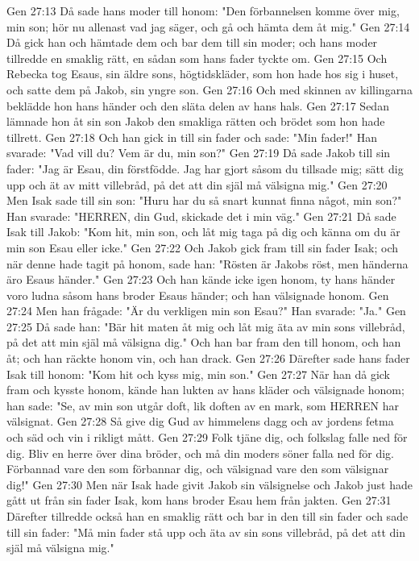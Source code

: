 Gen 27:13  Då sade hans moder till honom: "Den förbannelsen komme över mig, min son; hör nu allenast vad jag säger, och gå och hämta dem åt mig."
Gen 27:14  Då gick han och hämtade dem och bar dem till sin moder; och hans moder tillredde en smaklig rätt, en sådan som hans fader tyckte om.
Gen 27:15  Och Rebecka tog Esaus, sin äldre sons, högtidskläder, som hon hade hos sig i huset, och satte dem på Jakob, sin yngre son.
Gen 27:16  Och med skinnen av killingarna beklädde hon hans händer och den släta delen av hans hals.
Gen 27:17  Sedan lämnade hon åt sin son Jakob den smakliga rätten och brödet som hon hade tillrett.
Gen 27:18  Och han gick in till sin fader och sade: "Min fader!" Han svarade: "Vad vill du? Vem är du, min son?"
Gen 27:19  Då sade Jakob till sin fader: "Jag är Esau, din förstfödde. Jag har gjort såsom du tillsade mig; sätt dig upp och ät av mitt villebråd, på det att din själ må välsigna mig."
Gen 27:20  Men Isak sade till sin son: "Huru har du så snart kunnat finna något, min son?" Han svarade: "HERREN, din Gud, skickade det i min väg."
Gen 27:21  Då sade Isak till Jakob: "Kom hit, min son, och låt mig taga på dig och känna om du är min son Esau eller icke."
Gen 27:22  Och Jakob gick fram till sin fader Isak; och när denne hade tagit på honom, sade han: "Rösten är Jakobs röst, men händerna äro Esaus händer."
Gen 27:23  Och han kände icke igen honom, ty hans händer voro ludna såsom hans broder Esaus händer; och han välsignade honom.
Gen 27:24  Men han frågade: "Är du verkligen min son Esau?" Han svarade: "Ja."
Gen 27:25  Då sade han: "Bär hit maten åt mig och låt mig äta av min sons villebråd, på det att min själ må välsigna dig." Och han bar fram den till honom, och han åt; och han räckte honom vin, och han drack.
Gen 27:26  Därefter sade hans fader Isak till honom: "Kom hit och kyss mig, min son."
Gen 27:27  När han då gick fram och kysste honom, kände han lukten av hans kläder och välsignade honom; han sade: "Se, av min son utgår doft, lik doften av en mark, som HERREN har välsignat.
Gen 27:28  Så give dig Gud av himmelens dagg och av jordens fetma och säd och vin i rikligt mått.
Gen 27:29  Folk tjäne dig, och folkslag falle ned för dig. Bliv en herre över dina bröder, och må din moders söner falla ned för dig. Förbannad vare den som förbannar dig, och välsignad vare den som välsignar dig!"
Gen 27:30  Men när Isak hade givit Jakob sin välsignelse och Jakob just hade gått ut från sin fader Isak, kom hans broder Esau hem från jakten.
Gen 27:31  Därefter tillredde också han en smaklig rätt och bar in den till sin fader och sade till sin fader: "Må min fader stå upp och äta av sin sons villebråd, på det att din själ må välsigna mig."
